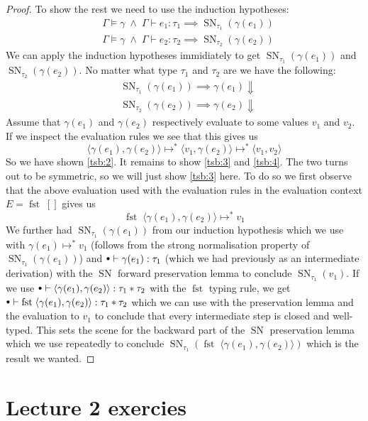 \documentclass[a4paper,10pt,fleqn]{article}
\newcommand{\tuple}[1]{\ensuremath{\langle #1 \rangle}}
\DeclareMathOperator{\SNPred}{SN}
\DeclareMathOperator{\fst}{fst}
\newcommand{\evalto}{\ensuremath{\mapsto}}
\newcommand{\evaltos}[1][*]{\ensuremath{\evalto^{#1}}}
\newcommand{\mtenv}{{\raisebox{1.5pt}{$\scriptstyle\bullet$}}}
\newcommand{\SN}[2]{\ensuremath{\SNPred_{#1}(#2)}}
\newcommand{\pand}{\ensuremath{\; \wedge \;}}
\begin{document}
\begin{proof}
To show the rest we need to use the induction hypotheses:
  \begin{align*}
   & \Gamma \models \gamma \pand \Gamma \vdash e_1 : \tau_1 \implies \SN{\tau_1}{\gamma(e_1)} \\
   & \Gamma \models \gamma \pand \Gamma \vdash e_2 : \tau_2 \implies \SN{\tau_2}{\gamma(e_2)}
  \end{align*}
  We can apply the induction hypotheses immidiately to get $\SN{\tau_1}{\gamma(e_1)}$ and $\SN{\tau_2}{\gamma(e_2)}$. No matter what type $\tau_1$ and $\tau_2$ are we have the following:
  \begin{align*}
   &\SN{\tau_1}{\gamma(e_1)} \implies \gamma(e_1) \Downarrow \\
   &\SN{\tau_2}{\gamma(e_2)} \implies \gamma(e_2) \Downarrow
  \end{align*}
  Assume that $\gamma(e_1)$ and $\gamma(e_2)$ respectively evaluate to some values $v_1$ and $v_2$. If we inspect the evaluation rules we see that this gives us
  \[
    \tuple{\gamma(e_1),\gamma(e_2)} \evaltos \tuple{v_1,\gamma(e_2)} \evaltos \tuple{v_1,v_2}
  \]
So we have shown \ref{tsb:2}. It remains to show \ref{tsb:3} and \ref{tsb:4}. The two turns out to be symmetric, so we will just show \ref{tsb:3} here. To do so we first observe that the above evaluation used with the evaluation rules in the evaluation context $E=\fst \; []$ gives us
  \[
    \fst \; \tuple{\gamma(e_1),\gamma(e_2)} \evaltos v_1
  \]
We further had $\SN{\tau_1}{\gamma(e_1)}$ from our induction hypothesis which we use with $\gamma(e_1) \evaltos v_1$ (follows from the strong normalisation property of $\SN{\tau_1}{\gamma(e_1)}$) and $\mtenv \vdash \gamma(e_1) : \tau_1$ (which we had previously as an intermediate derivation) with the $\SNPred$ forward preservation lemma to conclude $\SN{\tau_1}{v_1}$. If we use $\mtenv \vdash \tuple{\gamma(e_1),\gamma(e_2)}: \tau_1 * \tau_2$ with the $\fst$ typing rule, we get $\mtenv \vdash \fst \; \tuple{\gamma(e_1),\gamma(e_2)}: \tau_1 * \tau_2$ which we can use with the preservation lemma and the evaluation to $v_1$ to conclude that every intermediate step is closed and well-typed. This sets the scene for the backward part of the $\SNPred$ preservation lemma which we use repeatedly to conclude $\SN{\tau_1}{\fst \; \tuple{\gamma(e_1),\gamma(e_2)}}$ which is the result we wanted.
\end{proof}

\section*{Lecture 2 exercies}
\end{document}
